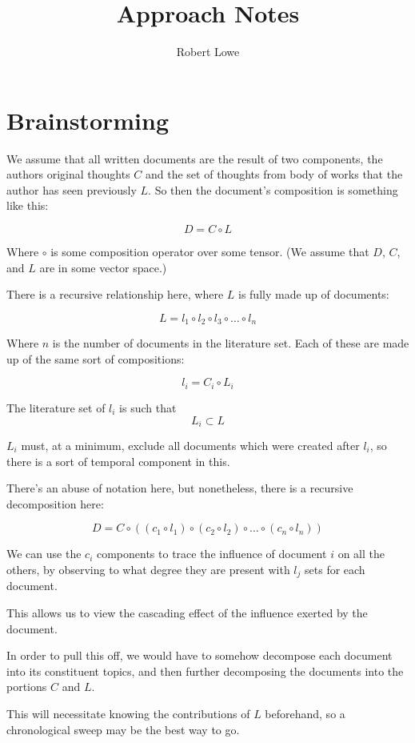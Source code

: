 \documentclass{article}
\title{Approach Notes}
\author{Robert Lowe}
\begin{document}
\maketitle

\newcommand{\tens}[1]{\mathcal{#1}}
\newcommand{\ntens}[1]{\hat{\tens{#1}}}

\section{Brainstorming}
We assume that all written documents are the result of two components, 
the authors original thoughts $C$ and the set of thoughts from body of works 
that the author has seen previously $L$.  So then the document's composition
is something like this:

\[
  D = C \circ L
\]

Where $\circ$ is some composition operator over some tensor.  (We assume
that $D$, $C$, and $L$ are in some vector space.)

There is a recursive relationship here, where $L$ is fully made up of documents:

\[
  L = l_1 \circ l_2 \circ l_3 \circ \ldots \circ l_n
\]

Where $n$ is the number of documents in the literature set.
Each of these are made up of the same sort of compositions:

\[
  l_i = C_i \circ L_i
\]


The literature set of $l_i$ is such that
\[
  L_i \subset L
\]

$L_i$ must, at a minimum, exclude all documents which were created after
$l_i$, so there is a sort of temporal component in this.


There's an abuse of notation here, but nonetheless, there is a recursive decomposition here:

\[
 D = C \circ ((c_1\circ l_1)\circ (c_2\circ l_2) \circ \ldots \circ (c_n \circ l_n))
\]

We can use the $c_i$ components to trace the influence of document $i$ on all the others, by observing to what degree they are present with $l_j$ sets for each document.

This allows us to view the cascading effect of the influence exerted by the
document.

In order to pull this off, we would have to somehow decompose each document into
its constituent topics, and then further decomposing the documents into the portions $C$ and $L$.

This will necessitate knowing the contributions of $L$ beforehand, so a 
chronological sweep may be the best way to go.
\end{document}
